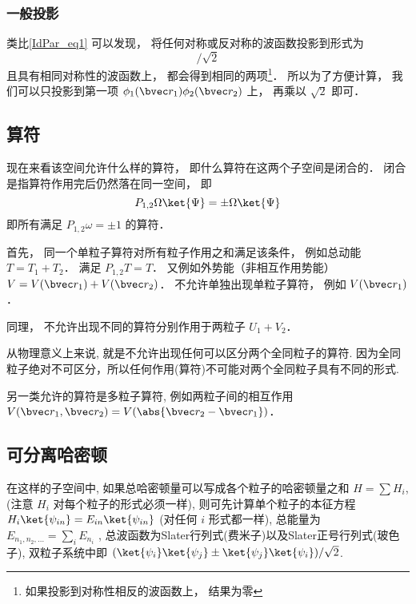\subsubsection{一般投影}
类比\autoref{IdPar_eq1} 可以发现， 将任何对称或反对称的波函数投影到形式为
\begin{equation}
[\phi_1(\bvec r_1)\phi_2(\bvec r_2) \pm \phi_2(\bvec r_1)\phi_1(\bvec r_2)]/\sqrt{2}
\end{equation}
且具有相同对称性的波函数上， 都会得到相同的两项\footnote{如果投影到对称性相反的波函数上， 结果为零}． 所以为了方便计算， 我们可以只投影到第一项 $\phi_1(\bvec r_1)\phi_2(\bvec r_2)$ 上， 再乘以 $\sqrt{2}$ 即可．

\subsection{算符}
现在来看该空间允许什么样的算符， 即什么算符在这两个子空间是闭合的． 闭合是指算符作用完后仍然落在同一空间， 即
\begin{equation}
P_{1,2}\Omega\ket{\Psi} = \pm \Omega \ket{\Psi}
\end{equation}
即所有满足 $P_{1,2}\omega = \pm 1$ 的算符．

首先， 同一个单粒子算符对所有粒子作用之和满足该条件， 例如总动能 $T = T_1 + T_2$． 满足 $P_{1,2}T = T$． 又例如外势能（非相互作用势能） $V = V(\bvec r_1) + V(\bvec r_2)$． 不允许单独出现单粒子算符， 例如 $V(\bvec r_1)$．

同理， 不允许出现不同的算符分别作用于两粒子 $U_1 + V_2$．

从物理意义上来说, 就是不允许出现任何可以区分两个全同粒子的算符. 因为全同粒子绝对不可区分，所以任何作用(算符)不可能对两个全同粒子具有不同的形式.

另一类允许的算符是多粒子算符, 例如两粒子间的相互作用 $V(\bvec r_1, \bvec r_2) = V(\abs{\bvec r_2 - \bvec r_1})$．

\subsection{可分离哈密顿}
在这样的子空间中, 如果总哈密顿量可以写成各个粒子的哈密顿量之和 $H = \sum H_i$, (注意 $H_i$ 对每个粒子的形式必须一样), 则可先计算单个粒子的本征方程 $H_i \ket{\psi_{in}} = E_{in}\ket{\psi_{in}}$ (对任何 $i$ 形式都一样), 总能量为 $E_{n_1,n_2,\dots} = \sum_i E_{n_i}$ , 总波函数为Slater行列式(费米子)以及Slater正号行列式(玻色子), 双粒子系统中即 $(\ket{\psi_i}\ket{\psi_j} \pm \ket{\psi_j}\ket{\psi_i})/\sqrt{2}$. 

